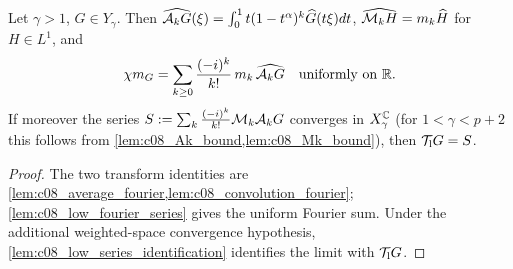 \begin{lemma}
  \label{lem:c08_low_series}
  Let $\gamma>1$, $G\in Y_\gamma$. Then $\widehat{\mathcal{A}_kG}(\xi)=\int_0^1t(1-t^\alpha)^k\widehat G(t\xi)dt$, $\widehat{\mathcal{M}_kH}=m_k\widehat H$ for
  $H\in L^1$, and
  \begin{equation}\label{eqn:linear_low_frequency_series}
    \chi m_G=\sum_{k\ge0}\frac{(-i)^k}{k!}\,m_k\,\widehat{\mathcal{A}_kG}\quad\text{uniformly on }\mathbb{R} .
  \end{equation}
  If moreover the series $S:=\sum_k\frac{(-i)^k}{k!}\mathcal{M}_k\mathcal{A}_kG$ converges in $X^{\mathbb{C}}_\gamma$ (for $1<\gamma<p+2$ this follows from
  \cref{lem:c08_Ak_bound,lem:c08_Mk_bound}), then $\mathcal{T}_{\rm l}G=S$.
\end{lemma}
\begin{proof}
  The two transform identities are \cref{lem:c08_average_fourier,lem:c08_convolution_fourier};
  \cref{lem:c08_low_fourier_series} gives the uniform Fourier sum. Under the additional weighted-space
  convergence hypothesis, \cref{lem:c08_low_series_identification} identifies the limit with $\mathcal{T}_{\rm l}G$.
\end{proof}

